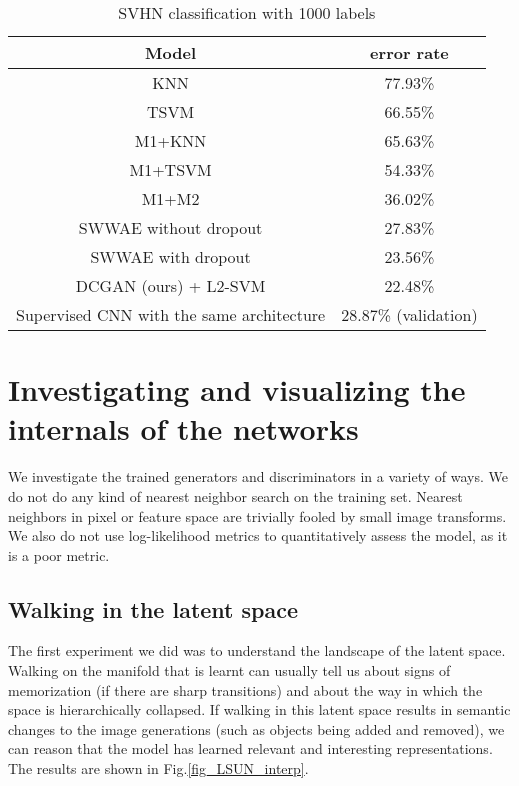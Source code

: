 \documentclass{article} \usepackage{iclr2016_conference,times}
\begin{document}
\begin{table}[h]
\caption{SVHN classification with 1000 labels}
\begin{center}
\begin{tabular}{ |c|c| }
    \hline
    \textbf{Model} & error rate\\
    \hline
    KNN & 77.93\%\\
    TSVM & 66.55\%\\
    M1+KNN & 65.63\%\\
    M1+TSVM & 54.33\%\\
    M1+M2 & 36.02\%\\
    \hline
    SWWAE without dropout & 27.83\%\\
    SWWAE with dropout & 23.56\%\\
    \hline
    DCGAN (ours) + L2-SVM & 22.48\%\\
    Supervised CNN with the same architecture & 28.87\% (validation)\\
    \hline
\end{tabular}
\end{center}
\label{tab:svhn_results}
\end{table}

\section{Investigating and visualizing the internals of the networks}

We investigate the trained generators and discriminators in a variety of ways. We do not do any kind of nearest neighbor search on the training set. Nearest neighbors in pixel or feature space are trivially fooled \citep{Theis2015d} by small image transforms. We also do not use log-likelihood metrics to quantitatively assess the model, as it is a poor \citep{Theis2015d} metric. 

\subsection{Walking in the latent space}
The first experiment we did was to understand the landscape of the latent space. Walking on the manifold that is learnt can usually tell us about signs of memorization (if there are sharp transitions) and about the way in which the space is hierarchically collapsed. If walking in this latent space results in semantic changes to the image generations (such as objects being added and removed), we can reason that the model has learned relevant and interesting representations. The results are shown in Fig.\ref{fig_LSUN_interp}.
\end{document}
